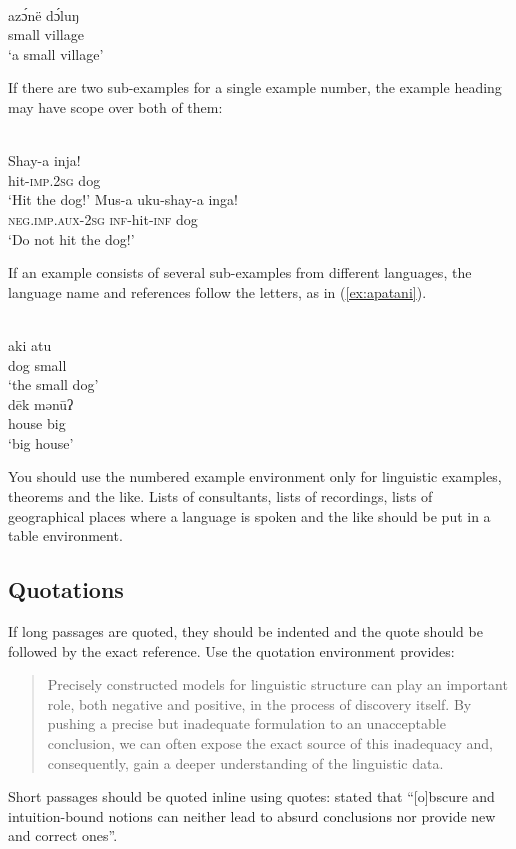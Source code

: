 {\def\exfont{\normalsize\itshape}
\ea\label{ex-typology}
\\
\gll azɔ́në dɔ́luŋ\\
     small village\\ 
\glt `a small village' 
\z


If there are two sub-examples for a single example number, the example heading may have scope over both of them:

\ea
{}\\
\ea
\gll Shay-a		inja!\\
hit-\textsc{imp.2sg}	dog\\
\glt `Hit the dog!'
\ex
\gll	Mus-a	uku-shay-a	inga! \\
	\textsc{neg.imp.aux-2sg}	\textsc{inf}-hit-\textsc{inf}	dog \\
\glt		`Do not hit the dog!'	
\z
\z

If an example consists of several sub-examples from different languages, the language name and references follow the letters, as in (\ref{ex:apatani}).

\ea\label{ex:apatani}
\ea
{}\\
\gll aki atu\\ 
     dog small\\ 
\glt ‘the small dog’ 
\ex 
{}\\ 
\gll dēk mənūʔ\\
     house big\\
\glt ‘big house’ 
\z
\z

You should use the numbered example environment only for linguistic examples, theorems and the like. Lists of consultants, lists of recordings, lists of geographical places where a language is spoken and the like should be put in a table environment. 


\subsection{Quotations}

If long passages are quoted, they should be indented and the quote should be followed by the exact reference. Use the quotation environment \latex provides:
\begin{quotation}
Precisely constructed models for linguistic structure can play an
important role, both negative and positive, in the process of discovery 
itself. By pushing a precise but inadequate formulation to
an unacceptable conclusion, we can often expose the exact source
of this inadequacy and, consequently, gain a deeper understanding
of the linguistic data.
\citep[5]{Chomsky57a}
\end{quotation}
%
Short passages should be quoted inline using quotes: \citet[5]{Chomsky57a} stated that ``[o]bscure
  and intuition-bound notions can neither lead to absurd conclusions nor provide new and
correct ones''.

}
